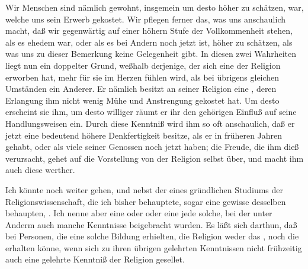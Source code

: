 \begin{aufza}
\begin{aufzb}
\item  Wir Menschen sind nämlich gewohnt,  insgemein um desto höher zu schätzen,  war, welche uns sein Erwerb gekostet. Wir pflegen ferner das, was uns anschaulich macht, daß wir gegenwärtig auf einer höhern Stufe der Vollkommenheit stehen, als es ehedem war, oder als es bei Andern noch jetzt ist, höher zu schätzen, als was uns zu dieser Bemerkung keine Gelegenheit gibt. In diesen zwei Wahrheiten liegt nun ein doppelter Grund, weßhalb derjenige, der sich eine  der Religion erworben hat, mehr  für sie im Herzen fühlen wird, als bei übrigens gleichen Umständen ein Anderer. Er nämlich besitzt an seiner Religion eine , deren Erlangung ihm nicht wenig Mühe und Anstrengung gekostet hat. Um desto  erscheint sie ihm, um desto williger räumt er ihr den gehörigen Einfluß auf seine Handlungsweisen ein. Durch diese Kenntniß wird ihm so oft anschaulich, daß er jetzt eine bedeutend höhere Denkfertigkeit besitze, als er in früheren Jahren gehabt, oder als viele seiner Genossen noch jetzt haben; die Freude, die ihm dieß verursacht, gehet auf die Vorstellung von der Religion selbst über, und macht ihm auch diese werther.~
\end{aufzb}
\item Ich könnte noch weiter gehen, und nebst der  eines gründlichen Studiums der Religionswissenschaft, die ich bisher behauptete, sogar eine gewisse  desselben  behaupten, . Ich nenne aber eine  oder  oder  eine jede solche, bei der unter Anderm auch manche  Kenntnisse beigebracht wurden. Es läßt sich darthun, daß bei Personen, die eine solche Bildung erhielten, die Religion weder das , noch die  erhalten könne, wenn sich zu ihren übrigen gelehrten Kenntnissen nicht frühzeitig auch eine gelehrte Kenntniß der Religion gesellet.
\begin{aufzb}

\end{aufzb}
\end{aufza}
